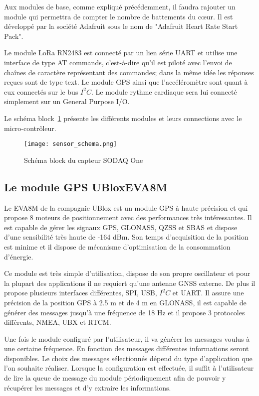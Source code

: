 Aux modules de base, comme expliqué précédemment, il faudra rajouter un module qui permettra de compter le nombre de battements du cœur. Il est développé par la société Adafruit sous le nom de "Adafruit Heart Rate Start Pack".


Le module LoRa RN2483 est connecté par un lien série UART et utilise une interface de type AT commands, c'est-à-dire qu'il est piloté avec l'envoi de chaînes de caractère représentant des commandes; dans la même idée les réponses reçues sont de type text. Le module GPS ainsi que l'accéléromètre sont quant à eux connectés sur le bus $I^{2}C$. Le module rythme cardiaque sera lui connecté simplement sur un General Purpose I/O.

Le schéma block~\ref{fig:schema_block_sodaq} présente les différents modules et leurs connections avec le micro-contrôleur.

\begin{figure}[htb]
\centering 
\texttt{[image: sensor\_schema.png]} 
\caption{Schéma block du capteur SODAQ One}
\label{fig:schema_block_sodaq}
\end{figure}

\subsection{Le module GPS UBloxEVA8M}\label{ch:module_ubloxeva8m}


Le EVA8M de la compagnie UBlox est un module GPS à haute précision et qui propose 8 moteurs de positionnement avec des performances très intéressantes. Il est capable de gérer les signaux GPS, GLONASS, QZSS et SBAS et dispose d'une sensibilité très haute de -164 dBm. Son temps d'acquisition de la position est minime et il dispose de mécanisme d'optimisation de la consommation d'énergie.

Ce module est très simple d'utilisation, dispose de son propre oscillateur et pour la plupart des applications il ne requiert qu'une antenne GNSS externe. De plus il propose plusieurs interfaces différentes, SPI, USB, $I^{2}C$ et UART. Il assure une précision de la position GPS à 2.5 m et de 4 m en GLONASS, il est capable de générer des messages jusqu'à une fréquence de 18 Hz et il propose 3 protocoles différents, NMEA, UBX et RTCM.

Une fois le module configuré par l'utilisateur, il va générer les messages voulus à une certaine fréquence. En fonction des messages différentes informations seront disponibles. Le choix des messages sélectionnés dépend du type d'application que l'on souhaite réaliser. Lorsque la configuration est effectuée, il suffit à l'utilisateur de lire la queue de message du module périodiquement afin de pouvoir y récupérer les messages et d'y extraire les informations.

